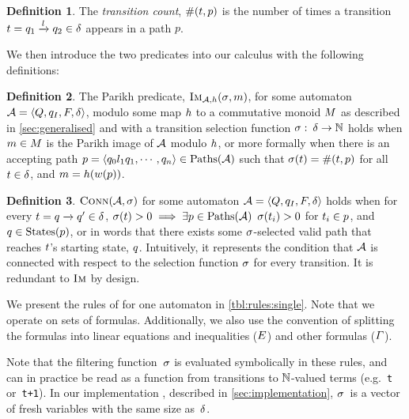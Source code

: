 \documentclass[acmsmall,review,anonymous,screen]{acmart}\settopmatter{printfolios=true,printccs=true,printacmref=true}
\theoremstyle{definition}
\newtheorem{definition}{Definition}[section]
\begin{document}
\begin{definition}
 The \textit{transition count}, $\operatorname{\#}(t, p)$ is the
 number of times a transition $t =
 q_1 \xrightarrow{l} q_2 \in \delta$ appears in a path
 $p$.
\end{definition}

We then introduce the two predicates into our calculus with the following
definitions:

\begin{definition}\label{def:single-image}
  The Parikh predicate, $\operatorname{\textsc{Im}}_{\mathcal{A}, h}(\operatorname{\sigma}, m)$, for some automaton
  $\mathcal{A} = \left\langle Q, q_I, F, \delta\right\rangle$, modulo some map $h$ to a
  commutative monoid $M$ as described in \cref{sec:generalised}
  and with a transition selection function
  $\operatorname{\sigma}:\: \delta \to \mathbb{N}$ holds when
  $m \in M$ is the Parikh image of $\mathcal{A}$
  modulo $h$, or more formally when there is an accepting path
  $p = \left\langle q_0 l_1 q_1 , \cdots , q_n\right\rangle \in \operatorname{Paths}(\mathcal{A})$ such
  that $\operatorname{\sigma}(t) = \operatorname{\#}(t, p)$
  for all $t \in \delta$, and $m = h(w(p))$.
\end{definition}

\begin{definition}
  $\operatorname{\textsc{Conn}}(\mathcal{A}, \operatorname{\sigma})$ for some automaton $\mathcal{A} =
  \left\langle Q, q_I, F, \delta\right\rangle$ holds when for every $t =
  q \xrightarrow{} q' \in \delta$, $\operatorname{\sigma}(t) > 0
  \implies \exists p \in \operatorname{Paths}(\mathcal{A})$ $\operatorname{\sigma}(t_i) > 0$
  for $t_i \in p$, and $q \in \operatorname{States}(p)$, or in words that
  there exists some $\operatorname{\sigma}$-selected valid path that reaches $t$'s
  starting state, $q$. Intuitively, it represents the condition that
  $\mathcal{A}$ is connected with respect to the selection function $\operatorname{\sigma}$ for
  every transition. It is redundant to $\operatorname{\textsc{Im}}$ by design.
\end{definition}

We present the rules of \Calculus{} for one automaton in
\cref{tbl:rules:single}. Note that we operate on sets of
formulas. Additionally, we also use the convention of splitting the
formulas into linear equations and inequalities ($E$)
and other formulas ($\varGamma$). 

Note that the filtering function~$\operatorname{\sigma}$ is evaluated symbolically in these
rules, and can in practice be read as a function from transitions to
$\mathbb{N}$-valued terms (e.g.~\texttt{t} or~\texttt{t+1}). In our implementation \Catra{},
described in \cref{sec:implementation}, $\operatorname{\sigma}$~is a vector of fresh variables
with the same size as~$\delta$.
\end{document}

